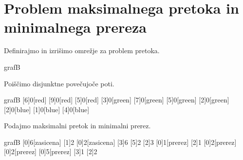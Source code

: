 \documentclass{article}
\begin{document}
\clearpage

\section{Problem maksimalnega pretoka in minimalnega prereza}

Definirajmo in izrišimo omrežje za problem pretoka.


\begin{pretok}{grafB}
\end{pretok}

\noindent
Poiščimo disjunktne povečujoče poti.

\begin{pretok}{grafB}
    \nicle
    [6]{0}[red]
    [9]{0}[red]
    [5]{0}[red]
    [3]{0}[green]
    [7]{0}[green]
    [5]{0}[green]
    [2]{0}[green]
    [2]{0}[blue]
    [1]{0}[blue]
    [4]{0}[blue]
\end{pretok}

\noindent
Podajmo maksimalni pretok in minimalni prerez.

\begin{pretok}{grafB}
    \nicle
    [0]{6}[zasicena]
    [1]{2}
    [0]{2}[zasicena]
    [3]{6}
    [5]{2}
    [2]{3}
    [0]{1}[prerez]
    [2]{1}
    [0]{2}[prerez]
    [0]{2}[prerez]
    [0]{5}[prerez]
    [3]{1}
    [2]{2}


\end{pretok}
\end{document}
